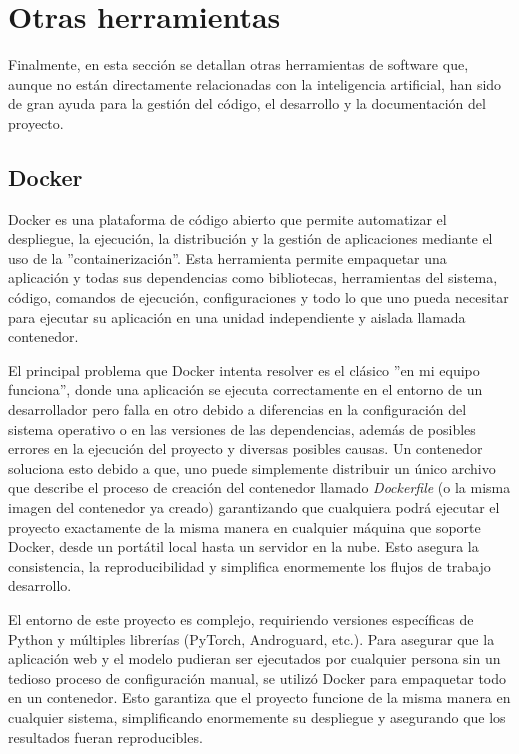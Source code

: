 \section{Otras herramientas}

Finalmente, en esta sección se detallan otras herramientas de software que, aunque no están directamente relacionadas con la inteligencia artificial, han sido de gran ayuda para la gestión del código, el desarrollo y la documentación del proyecto.

\subsection{Docker}


Docker es una plataforma de código abierto que permite automatizar el despliegue, la ejecución, la distribución y la gestión de aplicaciones mediante el uso de la ''containerización''. Esta herramienta permite empaquetar una aplicación y todas sus dependencias como bibliotecas, herramientas del sistema, código, comandos de ejecución, configuraciones y todo lo que uno pueda necesitar para ejecutar su aplicación en una unidad independiente y aislada llamada contenedor.

El principal problema que Docker intenta resolver es el clásico ''en mi equipo funciona'', donde una aplicación se ejecuta correctamente en el entorno de un desarrollador pero falla en otro debido a diferencias en la configuración del sistema operativo o en las versiones de las dependencias, además de posibles errores en la ejecución del proyecto y diversas posibles causas. Un contenedor soluciona esto debido a que, uno puede simplemente distribuir un único archivo que describe el proceso de creación del contenedor llamado \textit{Dockerfile} (o la misma imagen del contenedor ya creado) garantizando que cualquiera podrá ejecutar el proyecto exactamente de la misma manera en cualquier máquina que soporte Docker, desde un portátil local hasta un servidor en la nube. Esto asegura la consistencia, la reproducibilidad y simplifica enormemente los flujos de trabajo desarrollo.

El entorno de este proyecto es complejo, requiriendo versiones específicas de Python y múltiples librerías (PyTorch, Androguard, etc.). Para asegurar que la aplicación web y el modelo pudieran ser ejecutados por cualquier persona sin un tedioso proceso de configuración manual, se utilizó Docker para empaquetar todo en un contenedor. Esto garantiza que el proyecto funcione de la misma manera en cualquier sistema, simplificando enormemente su despliegue y asegurando que los resultados fueran reproducibles.

